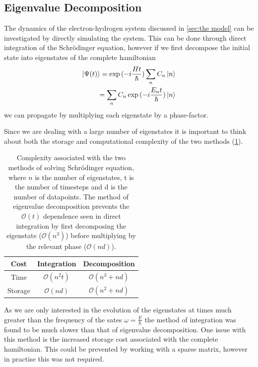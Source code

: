 \subsection{Eigenvalue Decomposition}
The dynamics of the electron-hydrogen
system discussed in \cref{sec:the model}
can be investigated by
directly simulating the system.
This can be done through direct
integration of the
Schrödinger equation, however
if we first decompose
the initial state
into eigenstates
of the complete hamiltonian\cite{conduit}
\begin{align}
    \ket{\Psi(t)} = \exp{(-i\frac{Ht}{\hbar})} \sum_n C_n \ket{n} \\
    = \sum_n C_n \exp{(-i\frac{E_n t}{\hbar})} \ket{n}
\end{align}
we can propagate
by multiplying each eigenstate
by a phase-factor.

Since we are dealing with a
large number of eigenstates
it is important to think
about both the storage
and computational complexity
of the two methods (\cref{tab:algorithm complexity}).
\begin{table}[htbp]
    \begin{center}
        \begin{tabular}{ *{3}{c} }
            \toprule
            Cost    & Integration            & Decomposition              \\
            \midrule
            Time    & \(\mathcal{O}(n^2 t)\) & \(\mathcal{O}(n^3 + n d)\) \\
            Storage & \(\mathcal{O}(n d)\)   & \(\mathcal{O}(n^2 + n d)\) \\
            \bottomrule
        \end{tabular}
    \end{center}
    \caption{Complexity associated with the
        two methods of solving Schrödinger equation,
        where \(n\) is the number of eigenstates, t
        is the number of timesteps and d is the
        number of datapoints. The method
        of eigenvalue decomposition
        prevents the \(\mathcal{O}(t)\)
        dependence seen
        in direct integration
        by first decomposing the
        eigenstate (\(\mathcal{O}(n^3)\))
        before multiplying
        by the relevant phase
        (\(\mathcal{O}(nd)\)).
    }\label{tab:algorithm complexity}
\end{table}

As we
are only interested in the
evolution of the eigenstates
at times much greater than
the frequency of the sates
\(\omega = \frac{E}{\hbar}\)
the method of integration
was found to be much
slower than that of eigenvalue
decomposition. One
issue with this method
is the increased storage
cost associated with
the complete
hamiltonian. This could
be prevented by
working with a sparse
matrix, however in
practise this
was not required.


